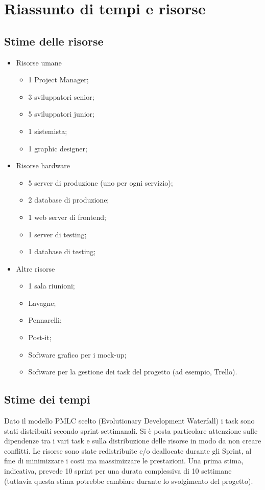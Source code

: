 \documentclass{article}
\begin{document}
  \newpage
  \section{Riassunto di tempi e risorse}

  \subsection{Stime delle risorse}
  \begin{itemize}
    \item Risorse umane
    \begin{itemize}
      \item 1 Project Manager;
      \item 3 sviluppatori senior;
      \item 5 sviluppatori junior;
      \item 1 sistemista;
      \item 1 graphic designer;
    \end{itemize}
    \item Risorse hardware
    \begin{itemize}
      \item 5 server di produzione (uno per ogni servizio);
      \item 2 database di produzione;
      \item 1 web server di frontend;
      \item 1 server di testing;
      \item 1 database di testing;
    \end{itemize}
    \item Altre risorse
    \begin{itemize}
      \item 1 sala riunioni;
      \item Lavagne;
      \item Pennarelli;
      \item Post-it;
      \item Software grafico per i mock-up;
      \item Software per la gestione dei task del progetto (ad esempio, Trello).
    \end{itemize}
  \end{itemize}

  \subsection{Stime dei tempi}

  Dato il modello PMLC scelto (Evolutionary Development Waterfall) i task sono stati distribuiti secondo sprint
    settimanali. Si è posta particolare attenzione sulle dipendenze tra i vari task e sulla distribuzione delle 
    risorse in modo da non creare conflitti.
    Le risorse sono state redistribuite e/o deallocate durante gli Sprint, al fine di minimizzare i costi 
    ma massimizzare le prestazioni.
    Una prima stima, indicativa, prevede 10 sprint per una durata complessiva di 10 settimane 
    (tuttavia questa stima potrebbe cambiare durante lo svolgimento del progetto). 
\end{document}
